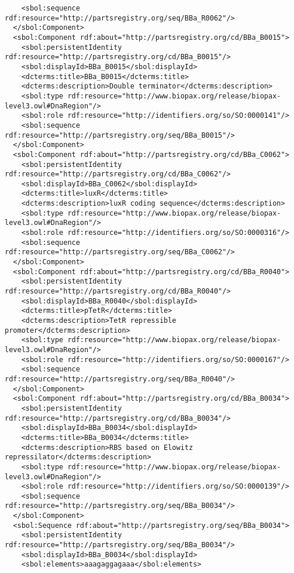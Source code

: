 \begin{lstlisting}
    <sbol:sequence rdf:resource="http://partsregistry.org/seq/BBa_R0062"/>
  </sbol:Component>
  <sbol:Component rdf:about="http://partsregistry.org/cd/BBa_B0015">
    <sbol:persistentIdentity rdf:resource="http://partsregistry.org/cd/BBa_B0015"/>
    <sbol:displayId>BBa_B0015</sbol:displayId>
    <dcterms:title>BBa_B0015</dcterms:title>
    <dcterms:description>Double terminator</dcterms:description>
    <sbol:type rdf:resource="http://www.biopax.org/release/biopax-level3.owl#DnaRegion"/>
    <sbol:role rdf:resource="http://identifiers.org/so/SO:0000141"/>
    <sbol:sequence rdf:resource="http://partsregistry.org/seq/BBa_B0015"/>
  </sbol:Component>
  <sbol:Component rdf:about="http://partsregistry.org/cd/BBa_C0062">
    <sbol:persistentIdentity rdf:resource="http://partsregistry.org/cd/BBa_C0062"/>
    <sbol:displayId>BBa_C0062</sbol:displayId>
    <dcterms:title>luxR</dcterms:title>
    <dcterms:description>luxR coding sequence</dcterms:description>
    <sbol:type rdf:resource="http://www.biopax.org/release/biopax-level3.owl#DnaRegion"/>
    <sbol:role rdf:resource="http://identifiers.org/so/SO:0000316"/>
    <sbol:sequence rdf:resource="http://partsregistry.org/seq/BBa_C0062"/>
  </sbol:Component>
  <sbol:Component rdf:about="http://partsregistry.org/cd/BBa_R0040">
    <sbol:persistentIdentity rdf:resource="http://partsregistry.org/cd/BBa_R0040"/>
    <sbol:displayId>BBa_R0040</sbol:displayId>
    <dcterms:title>pTetR</dcterms:title>
    <dcterms:description>TetR repressible promoter</dcterms:description>
    <sbol:type rdf:resource="http://www.biopax.org/release/biopax-level3.owl#DnaRegion"/>
    <sbol:role rdf:resource="http://identifiers.org/so/SO:0000167"/>
    <sbol:sequence rdf:resource="http://partsregistry.org/seq/BBa_R0040"/>
  </sbol:Component>
  <sbol:Component rdf:about="http://partsregistry.org/cd/BBa_B0034">
    <sbol:persistentIdentity rdf:resource="http://partsregistry.org/cd/BBa_B0034"/>
    <sbol:displayId>BBa_B0034</sbol:displayId>
    <dcterms:title>BBa_B0034</dcterms:title>
    <dcterms:description>RBS based on Elowitz repressilator</dcterms:description>
    <sbol:type rdf:resource="http://www.biopax.org/release/biopax-level3.owl#DnaRegion"/>
    <sbol:role rdf:resource="http://identifiers.org/so/SO:0000139"/>
    <sbol:sequence rdf:resource="http://partsregistry.org/seq/BBa_B0034"/>
  </sbol:Component>
  <sbol:Sequence rdf:about="http://partsregistry.org/seq/BBa_B0034">
    <sbol:persistentIdentity rdf:resource="http://partsregistry.org/seq/BBa_B0034"/>
    <sbol:displayId>BBa_B0034</sbol:displayId>
    <sbol:elements>aaagaggagaaa</sbol:elements>

\end{lstlisting}
